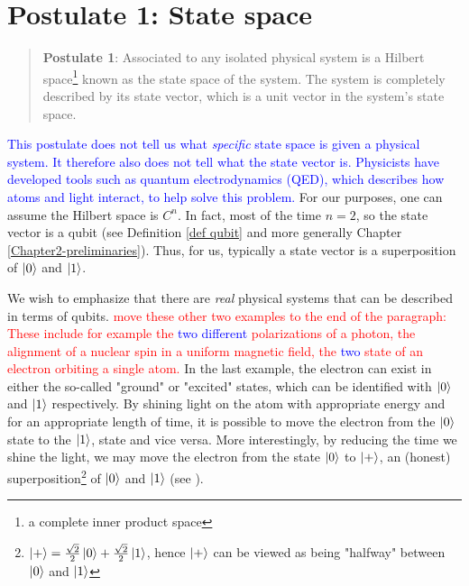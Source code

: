 \section{Postulate 1: State space}


\begin{quote}
    \textbf{Postulate 1}: Associated to any isolated physical system is a Hilbert space\footnote{a complete inner product space} known as the state space of the system. The system is completely described by its state vector, which is a unit vector in the system's state space.
\end{quote}

\textcolor{blue}{This postulate does not tell us what \textit{specific} state space is given a physical system. It therefore also does not tell what the state vector is. Physicists have developed tools such as quantum electrodynamics (QED), which describes how atoms and light interact, to help solve this problem.} For our purposes, one can assume the Hilbert space is $C^n$. In fact, most of the time $n=2$, so the state vector is a qubit (see Definition \ref{def qubit} and more generally Chapter \ref{Chapter2-preliminaries}).  Thus, for us, typically a state vector is a superposition of $\ket{0}$ and $\ket{1}$.

We wish to emphasize that there are {\emph{real}} physical systems that can be described in terms of qubits.  \textcolor{red}{move these other two examples to the end of the paragraph: These include for example the \textcolor{blue}{two different} polarizations of a photon, the alignment of a nuclear spin in a uniform magnetic field, the \textcolor{blue}{two} state of an electron orbiting a single atom.} In the last example, the electron can exist in either the so-called "ground" or "excited" states, which can be identified with $\ket{0}$ and $\ket{1}$ respectively. By shining light on the atom with appropriate energy and for an appropriate length of time, it is possible to move the electron from the $\ket{0}$ state to the $\ket{1}$, state and vice versa. More interestingly, by reducing the time we shine the light, we may move the electron from the state $\ket{0}$ to $\ket{+}$, an (honest) superposition\footnote{$\ket{+}=\frac{\sqrt{2}}{2}\ket{0}+\frac{\sqrt{2}}{2}\ket{1}$, hence $\ket{+}$ can be viewed as being "halfway" between $\ket{0}$ and $\ket{1}$} of $\ket{0}$ and $\ket{1}$ (see \cite{Nielsen}).


